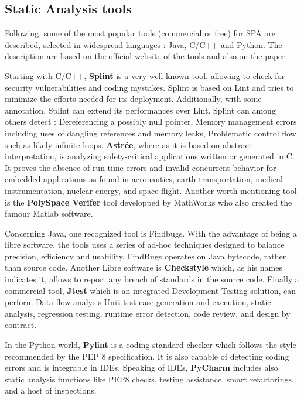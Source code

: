 \subsection{Static Analysis tools}
Following, some of the most popular tools (commercial or free) for SPA are described, selected in widespread languages : Java, C/C++ and Python. The description are based on the official website of the tools and also on the \cite{Gomes2009} paper.

Starting with C/C++, \textbf{Splint} is a very well known tool, allowing to check for security vulnerabilities and coding mystakes. Splint is based on Lint and tries to minimize the efforts needed for its deployment. Additionally, with some annotation, Splint can extend its performances over Lint. Splint can among others detect : Dereferencing a possibly null pointer, Memory management errors including uses of dangling references and memory leaks, Problematic control flow such as likely infinite loops. \textbf{Astrée}, where as it is based on abstract interpretation, is analyzing safety-critical appli­cations written or gen­er­ated in C. It proves the absence of run-­time errors and invalid concurrent behavior for embedded applications as found in aeronautics, earth transportation, medical instrumentation, nuclear energy, and space flight. Another worth mentioning tool is the \textbf{PolySpace Verifer} tool developped by MathWorks who also created the famour Matlab software. 

Concerning Java, one recognized tool is Findbugs. With the advantage of being a \gls{libre} software, the tools uses a series of ad-hoc techniques designed to balance precision, efficiency and usability. FindBugs operates on Java bytecode, rather than source code. Another Libre software is \textbf{Checkstyle} which, as his names indicates it, allows to report any breach of standards in the source code. Finally a commercial tool, \textbf{Jtest} which is an integrated Development Testing solution, can perform Data-flow analysis Unit test-case generation and execution, static analysis, regression testing, runtime error detection, code review, and design by contract.

In the Python world, \textbf{Pylint} is a coding standard checker which follows the style recommended by the PEP 8 specification. It is also capable of detecting coding errors and is integrable in IDEs. Speaking of IDEs, \textbf{PyCharm} includes also static analysis functions like PEP8 checks, testing assistance, smart refactorings, and a host of inspections.

